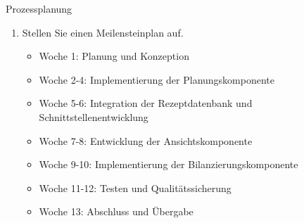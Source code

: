 \documentclass{article}
\begin{document}
\begin{exercise}{Prozessplanung}
\begin{enumerate}
    \item Stellen Sie einen Meilensteinplan auf.

          \begin{solution}
            \begin{itemize}
              \item Woche 1: Planung und Konzeption
              \item Woche 2-4: Implementierung der Planungskomponente
              \item Woche 5-6: Integration der Rezeptdatenbank und Schnittstellenentwicklung
              \item Woche 7-8: Entwicklung der Ansichtskomponente
              \item Woche 9-10: Implementierung der Bilanzierungskomponente
              \item Woche 11-12: Testen und Qualitätssicherung
              \item Woche 13: Abschluss und Übergabe
            \end{itemize}
          \end{solution}
  \end{enumerate}
\end{exercise}
\end{document}
